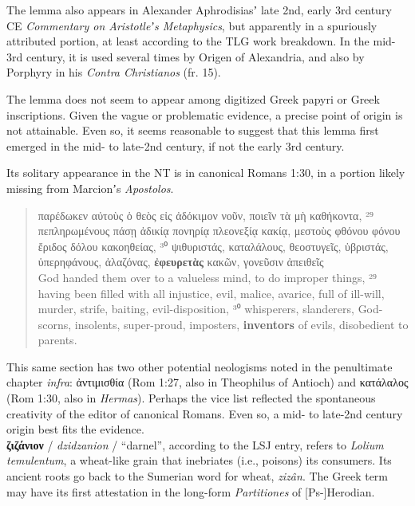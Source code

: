 The lemma also appears in Alexander Aphrodisiasʼ late 2nd, early 3rd century CE \textit{Commentary on Aristotleʼs Metaphysics}, %
but apparently in a spuriously attributed portion, at least according to the TLG work breakdown. %
In the mid-3rd century, it is used several times by Origen of Alexandria, %
and also by Porphyry in his \textit{Contra Christianos} (fr. 15). %

The lemma does not seem to appear among digitized Greek papyri or Greek inscriptions. %
Given the vague or problematic evidence, %
a precise point of origin is not attainable. %
Even so, it seems reasonable to suggest that this lemma first emerged in the mid- to late-2nd %
century, if not the early 3rd century. %

Its solitary appearance in the NT is in canonical Romans 1:30, %
in a portion likely missing from Marcionʼs \textit{Apostolos}. %

\vspace*{2mm} 
 \begin{quote} παρέδωκεν αὐτοὺς ὁ θεὸς εἰς ἀδόκιμον νοῦν, ποιεῖν τὰ μὴ καθήκοντα, %
 ²⁹ πεπληρωμένους πάσῃ ἀδικίᾳ πονηρίᾳ πλεονεξίᾳ κακίᾳ, %
 μεστοὺς φθόνου φόνου ἔριδος δόλου κακοηθείας, %
 ³⁰ ψιθυριστάς, καταλάλους, θεοστυγεῖς, ὑβριστάς, ὑπερηφάνους, %
 ἀλαζόνας, \textbf{ἐφευρετὰς} κακῶν, γονεῦσιν ἀπειθεῖς \\[1mm] %
 God handed them over to a valueless mind, to do improper things, %
 ²⁹ having been filled with all injustice, evil, malice, avarice, %
 full of ill-will, murder, strife, baiting, evil-disposition, %
 ³⁰ whisperers, slanderers, God-scorns, insolents, super-proud, %
 imposters, \textbf{inventors} of evils, disobedient to parents. \end{quote} %
 \vspace*{2mm}

 This same section has two other potential neologisms noted in the penultimate chapter \textit{infra}: %
 ἀντιμισθία (Rom 1:27, also in Theophilus of Antioch) and κατάλαλος (Rom 1:30, also in \textit{Hermas}). %
 Perhaps the vice list reflected the spontaneous creativity of the editor of canonical Romans. %
 Even so, a mid- to late-2nd century origin best fits the evidence. \\[1mm] %

\noindent{}\textbf{ζιζάνιον} / \textit{dzidzanion} / “darnel”, %
according to the LSJ entry, refers to \textit{Lolium temulentum}, %
a wheat-like grain that inebriates (i.e., poisons) its consumers. %
Its ancient roots go back to the Sumerian word for wheat, \textit{zizân}. %
The Greek term may have its first %
attestation in the long-form \textit{Partitiones} of [Ps-]Herodian.
\vspace*{3mm}

